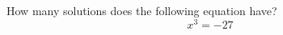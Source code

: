 \documentclass{ximera}
\author{David Kish}
\begin{document}
\begin{exercise}
How many solutions does the following equation have? \\
\[
x^3=-27
\]
\begin{multipleChoice}  
\end{multipleChoice}  
\end{exercise}
\end{document}
